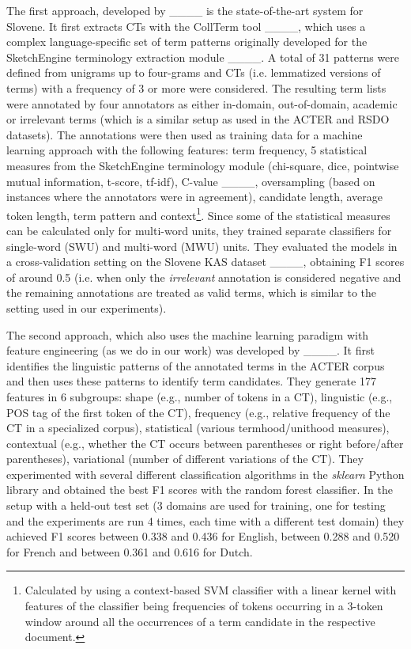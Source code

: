 The first approach, developed by ____ is the state-of-the-art system for Slovene. It first extracts CTs with the CollTerm tool ____, which uses a complex language-specific set of term patterns originally developed for the SketchEngine terminology extraction module ____. A total of 31 patterns were defined from unigrams up to four-grams and CTs (i.e. lemmatized versions of terms) with a frequency of 3 or more were considered. The resulting term lists were annotated by four annotators as either in-domain, out-of-domain, academic or irrelevant terms (which is a similar setup as used in the ACTER and RSDO datasets). The annotations were then used as training data for a machine learning approach with the following features: term frequency, 5 statistical measures from the SketchEngine terminology module (chi-square, dice, pointwise mutual information, t-score, tf-idf), C-value ____, oversampling (based on instances where the annotators were in agreement), candidate length, average token length, term pattern and context\footnote{Calculated by using a context-based SVM classifier with a linear kernel with features of the classifier being frequencies of tokens occurring in a 3-token window around all the occurrences of a term candidate in the respective document.}. Since some of the statistical measures can be calculated only for multi-word units, they trained separate classifiers for single-word (SWU) and multi-word (MWU) units. They evaluated the models in a cross-validation setting on the Slovene KAS dataset ____, obtaining F1 scores of around 0.5 (i.e. when only the \textit{irrelevant} annotation is considered negative and the remaining annotations are treated as valid terms, which is similar to the setting used in our experiments). 

The second approach, which also uses the machine learning paradigm with feature engineering (as we do in our work) was developed by ____. It first identifies the linguistic patterns of the annotated terms in the ACTER corpus and then uses these patterns to identify term candidates. They generate 177 features in 6 subgroups: shape (e.g., number of tokens in a CT), linguistic (e.g., POS tag of the first token of the CT), frequency (e.g., relative frequency of the CT in a specialized corpus), statistical (various termhood/unithood measures), contextual (e.g., whether the CT occurs between parentheses or right before/after parentheses), variational (number of different variations of the CT). They experimented with several different classification algorithms in the \textit{sklearn} Python library and obtained the best F1 scores with the random forest classifier. In the setup with a held-out test set (3 domains are used for training, one for testing and the experiments are run 4 times, each time with a different test domain) they achieved F1 scores between 0.338 and 0.436 for English, between 0.288 and 0.520 for French and between 0.361 and 0.616 for Dutch.